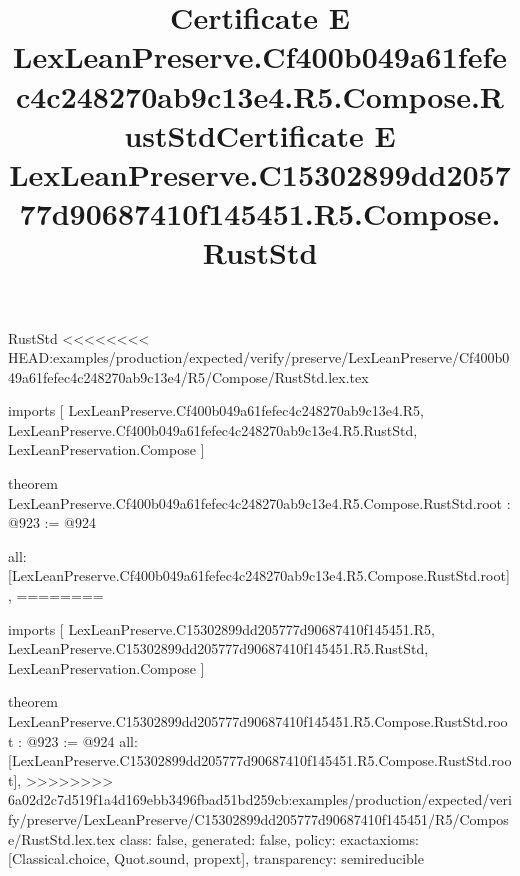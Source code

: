 \begin{lexlean}{RustStd}
<<<<<<<< HEAD:examples/production/expected/verify/preserve/LexLeanPreserve/Cf400b049a61fefec4c248270ab9c13e4/R5/Compose/RustStd.lex.tex
\title{Certificate E LexLeanPreserve.Cf400b049a61fefec4c248270ab9c13e4.R5.Compose.RustStd}
\begin{coremodule}
imports [
  LexLeanPreserve.Cf400b049a61fefec4c248270ab9c13e4.R5,
  LexLeanPreserve.Cf400b049a61fefec4c248270ab9c13e4.R5.RustStd,
  LexLeanPreservation.Compose
]

theorem LexLeanPreserve.Cf400b049a61fefec4c248270ab9c13e4.R5.Compose.RustStd.root : @923 := @924 {
  all: [LexLeanPreserve.Cf400b049a61fefec4c248270ab9c13e4.R5.Compose.RustStd.root],
========
\title{Certificate E LexLeanPreserve.C15302899dd205777d90687410f145451.R5.Compose.RustStd}
\begin{coremodule}
imports [
  LexLeanPreserve.C15302899dd205777d90687410f145451.R5,
  LexLeanPreserve.C15302899dd205777d90687410f145451.R5.RustStd,
  LexLeanPreservation.Compose
]

theorem LexLeanPreserve.C15302899dd205777d90687410f145451.R5.Compose.RustStd.root : @923 := @924 {
  all: [LexLeanPreserve.C15302899dd205777d90687410f145451.R5.Compose.RustStd.root],
>>>>>>>> 6a02d2c7d519f1a4d169ebb3496fbad51bd259cb:examples/production/expected/verify/preserve/LexLeanPreserve/C15302899dd205777d90687410f145451/R5/Compose/RustStd.lex.tex
  class: false,
  generated: false,
  policy: exact{axioms: [Classical.choice, Quot.sound, propext]},
  transparency: semireducible
}


\end{coremodule}}
\end{coremodule}
\end{lexlean}
